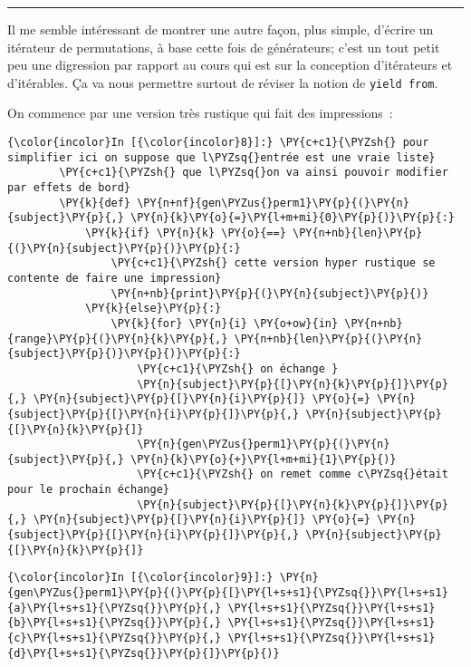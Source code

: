\begin{center}\rule{0.5\linewidth}{\linethickness}\end{center}

    Il me semble intéressant de montrer une autre façon, plus simple,
d'écrire un itérateur de permutations, à base cette fois de générateurs;
c'est un tout petit peu une digression par rapport au cours qui est sur
la conception d'itérateurs et d'itérables. Ça va nous permettre surtout
de réviser la notion de \texttt{yield\ from}.

    On commence par une version très rustique qui fait des impressions~:

    \begin{Verbatim}[commandchars=\\\{\}]
{\color{incolor}In [{\color{incolor}8}]:} \PY{c+c1}{\PYZsh{} pour simplifier ici on suppose que l\PYZsq{}entrée est une vraie liste}
        \PY{c+c1}{\PYZsh{} que l\PYZsq{}on va ainsi pouvoir modifier par effets de bord}
        \PY{k}{def} \PY{n+nf}{gen\PYZus{}perm1}\PY{p}{(}\PY{n}{subject}\PY{p}{,} \PY{n}{k}\PY{o}{=}\PY{l+m+mi}{0}\PY{p}{)}\PY{p}{:}
            \PY{k}{if} \PY{n}{k} \PY{o}{==} \PY{n+nb}{len}\PY{p}{(}\PY{n}{subject}\PY{p}{)}\PY{p}{:}
                \PY{c+c1}{\PYZsh{} cette version hyper rustique se contente de faire une impression}
                \PY{n+nb}{print}\PY{p}{(}\PY{n}{subject}\PY{p}{)}
            \PY{k}{else}\PY{p}{:}
                \PY{k}{for} \PY{n}{i} \PY{o+ow}{in} \PY{n+nb}{range}\PY{p}{(}\PY{n}{k}\PY{p}{,} \PY{n+nb}{len}\PY{p}{(}\PY{n}{subject}\PY{p}{)}\PY{p}{)}\PY{p}{:}
                    \PY{c+c1}{\PYZsh{} on échange }
                    \PY{n}{subject}\PY{p}{[}\PY{n}{k}\PY{p}{]}\PY{p}{,} \PY{n}{subject}\PY{p}{[}\PY{n}{i}\PY{p}{]} \PY{o}{=} \PY{n}{subject}\PY{p}{[}\PY{n}{i}\PY{p}{]}\PY{p}{,} \PY{n}{subject}\PY{p}{[}\PY{n}{k}\PY{p}{]}
                    \PY{n}{gen\PYZus{}perm1}\PY{p}{(}\PY{n}{subject}\PY{p}{,} \PY{n}{k}\PY{o}{+}\PY{l+m+mi}{1}\PY{p}{)}
                    \PY{c+c1}{\PYZsh{} on remet comme c\PYZsq{}était pour le prochain échange}
                    \PY{n}{subject}\PY{p}{[}\PY{n}{k}\PY{p}{]}\PY{p}{,} \PY{n}{subject}\PY{p}{[}\PY{n}{i}\PY{p}{]} \PY{o}{=} \PY{n}{subject}\PY{p}{[}\PY{n}{i}\PY{p}{]}\PY{p}{,} \PY{n}{subject}\PY{p}{[}\PY{n}{k}\PY{p}{]}
\end{Verbatim}


    \begin{Verbatim}[commandchars=\\\{\}]
{\color{incolor}In [{\color{incolor}9}]:} \PY{n}{gen\PYZus{}perm1}\PY{p}{(}\PY{p}{[}\PY{l+s+s1}{\PYZsq{}}\PY{l+s+s1}{a}\PY{l+s+s1}{\PYZsq{}}\PY{p}{,} \PY{l+s+s1}{\PYZsq{}}\PY{l+s+s1}{b}\PY{l+s+s1}{\PYZsq{}}\PY{p}{,} \PY{l+s+s1}{\PYZsq{}}\PY{l+s+s1}{c}\PY{l+s+s1}{\PYZsq{}}\PY{p}{,} \PY{l+s+s1}{\PYZsq{}}\PY{l+s+s1}{d}\PY{l+s+s1}{\PYZsq{}}\PY{p}{]}\PY{p}{)}
\end{Verbatim}


